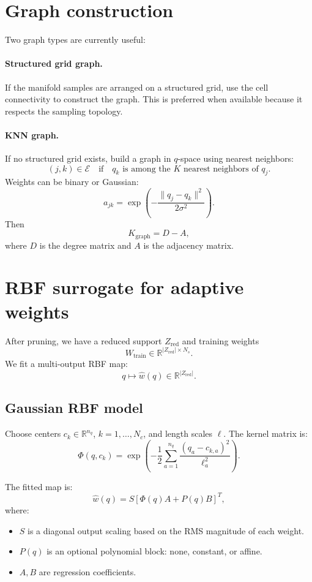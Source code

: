 \documentclass[11pt]{article}
\newcommand{\R}{\mathbb{R}}
\newcommand{\Egraph}{\mathcal{E}}
\newcommand{\Kgraph}{K_{\mathrm{graph}}}
\newcommand{\zred}{Z_{\mathrm{red}}}
\begin{document}
\section{Graph construction}

Two graph types are currently useful:

\paragraph{Structured grid graph.}
If the manifold samples are arranged on a structured grid, use the cell connectivity
to construct the graph.  This is preferred when available because it respects the
sampling topology.

\paragraph{KNN graph.}
If no structured grid exists, build a graph in \(q\)-space using nearest neighbors:
\[
  (j,k)\in\Egraph
  \quad\text{if}\quad
  q_k\text{ is among the }K\text{ nearest neighbors of }q_j.
\]
Weights can be binary or Gaussian:
\[
  a_{jk}=\exp\left(-\frac{\|q_j-q_k\|^2}{2\sigma^2}\right).
\]
Then
\[
  \Kgraph = D-A,
\]
where \(D\) is the degree matrix and \(A\) is the adjacency matrix.

\section{RBF surrogate for adaptive weights}

After pruning, we have a reduced support \(\zred\) and training weights
\[
  W_{\mathrm{train}}\in\R^{|\zred|\times N_s}.
\]
We fit a multi-output RBF map:
\[
  q \longmapsto \widehat w(q)\in\R^{|\zred|}.
\]

\subsection{Gaussian RBF model}

Choose centers \(c_k\in\R^{n_q}\), \(k=1,\ldots,N_c\), and length scales \(\ell\).
The kernel matrix is:
\[
  \Phi(q,c_k)=
  \exp\left(
    -\frac{1}{2}
    \sum_{a=1}^{n_q}
    \frac{(q_a-c_{k,a})^2}{\ell_a^2}
  \right).
\]

The fitted map is:
\[
  \widehat w(q)
  =
  S\left[
  \Phi(q)A + P(q)B
  \right]^T,
\]
where:
\begin{itemize}
  \item \(S\) is a diagonal output scaling based on the RMS magnitude of each weight.
  \item \(P(q)\) is an optional polynomial block: none, constant, or affine.
  \item \(A,B\) are regression coefficients.
\end{itemize}
\end{document}
